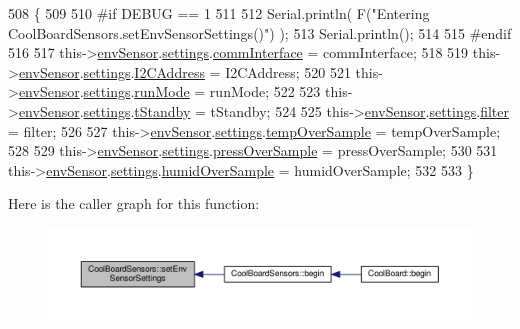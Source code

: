 \begin{DoxyCode}
508 \{
509 
510 \textcolor{preprocessor}{#if DEBUG == 1}
511     
512     Serial.println( F(\textcolor{stringliteral}{"Entering CoolBoardSensors.setEnvSensorSettings()"}) );
513     Serial.println();
514 
515 \textcolor{preprocessor}{#endif}
516   
517     this->\hyperlink{class_cool_board_sensors_a868e38985e9a2412829fa2790ca13e2e}{envSensor}.\hyperlink{class_b_m_e280_af06253eb2f8ad4b5fabb858bc4a973bf}{settings}.\hyperlink{struct_sensor_settings_a5bf116387c543a6ea5732976424e8cb1}{commInterface} = commInterface;      
518 
519     this->\hyperlink{class_cool_board_sensors_a868e38985e9a2412829fa2790ca13e2e}{envSensor}.\hyperlink{class_b_m_e280_af06253eb2f8ad4b5fabb858bc4a973bf}{settings}.\hyperlink{struct_sensor_settings_af8103021dbce7e5ee6d786c4893324f7}{I2CAddress} = I2CAddress;
520 
521     this->\hyperlink{class_cool_board_sensors_a868e38985e9a2412829fa2790ca13e2e}{envSensor}.\hyperlink{class_b_m_e280_af06253eb2f8ad4b5fabb858bc4a973bf}{settings}.\hyperlink{struct_sensor_settings_a0ffbdf34f4c23a2a167f00e4cb971dec}{runMode} = runMode; 
522 
523     this->\hyperlink{class_cool_board_sensors_a868e38985e9a2412829fa2790ca13e2e}{envSensor}.\hyperlink{class_b_m_e280_af06253eb2f8ad4b5fabb858bc4a973bf}{settings}.\hyperlink{struct_sensor_settings_a7098be3c1df0271dc9bc0fb45c1e9bb9}{tStandby} = tStandby; 
524 
525     this->\hyperlink{class_cool_board_sensors_a868e38985e9a2412829fa2790ca13e2e}{envSensor}.\hyperlink{class_b_m_e280_af06253eb2f8ad4b5fabb858bc4a973bf}{settings}.\hyperlink{struct_sensor_settings_a69dc95368069a0f408a141d4c2cbf045}{filter} = filter; 
526 
527     this->\hyperlink{class_cool_board_sensors_a868e38985e9a2412829fa2790ca13e2e}{envSensor}.\hyperlink{class_b_m_e280_af06253eb2f8ad4b5fabb858bc4a973bf}{settings}.\hyperlink{struct_sensor_settings_abdedc9d05f4850c58005313486958073}{tempOverSample} = tempOverSample;
528 
529     this->\hyperlink{class_cool_board_sensors_a868e38985e9a2412829fa2790ca13e2e}{envSensor}.\hyperlink{class_b_m_e280_af06253eb2f8ad4b5fabb858bc4a973bf}{settings}.\hyperlink{struct_sensor_settings_a85ba10cad25b479bba9cb42c6400ab21}{pressOverSample} = pressOverSample;
530 
531     this->\hyperlink{class_cool_board_sensors_a868e38985e9a2412829fa2790ca13e2e}{envSensor}.\hyperlink{class_b_m_e280_af06253eb2f8ad4b5fabb858bc4a973bf}{settings}.\hyperlink{struct_sensor_settings_a4a02fc7708071b88ccf610e3f7ed9d55}{humidOverSample} = humidOverSample;
532 
533 \}
\end{DoxyCode}
Here is the caller graph for this function\+:\nopagebreak
\begin{figure}[H]
\begin{center}
\leavevmode
\includegraphics[width=350pt]{de/d46/class_cool_board_sensors_a406307ffd70272282d91479c7ed8d66f_icgraph}
\end{center}
\end{figure}


